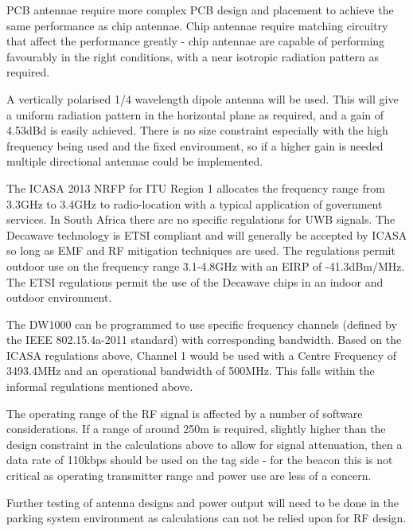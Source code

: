PCB antennae require more complex PCB design and placement to achieve the same performance as chip antennae. Chip antennae require matching circuitry that affect the performance greatly - chip antennae are capable of performing favourably in the right conditions, with a near isotropic radiation pattern as required.\cite{TI-Ant}

A vertically polarised 1/4 wavelength dipole antenna will be used. This will give a uniform radiation pattern in the horizontal plane as required, and a gain of 4.53dBd is easily achieved. There is no size constraint especially with the high frequency being used and the fixed environment, so if a higher gain is needed multiple directional antennae could be implemented.

The ICASA 2013 NRFP for ITU Region 1 allocates the frequency range from 3.3GHz to 3.4GHz to radio-location with a typical application of government services. In South Africa there are no specific regulations for UWB signals. The Decawave technology is ETSI compliant and will generally be accepted by ICASA so long as EMF and RF mitigation techniques are used. The regulations permit outdoor use on the frequency range 3.1-4.8GHz with an EIRP of -41.3dBm/MHz. The ETSI regulations permit the use of the Decawave chips in an indoor and outdoor environment.

The DW1000 can be programmed to use specific frequency channels (defined by the IEEE 802.15.4a-2011 standard) with corresponding bandwidth. Based on the ICASA regulations above, Channel 1 would be used with a Centre Frequency of 3493.4MHz and an operational bandwidth of 500MHz. This falls within the informal regulations mentioned above. 

The operating range of the RF signal is affected by a number of software considerations. If a range of around 250m is required, slightly higher than the design constraint in the calculations above to allow for signal attenuation, then a data rate of 110kbps should be used on the tag side - for the beacon this is not critical as operating transmitter range and power use are less of a concern.

\newpage
{}
Further testing of antenna designs and power output will need to be done in the parking system environment as calculations can not be relied upon for RF design.


